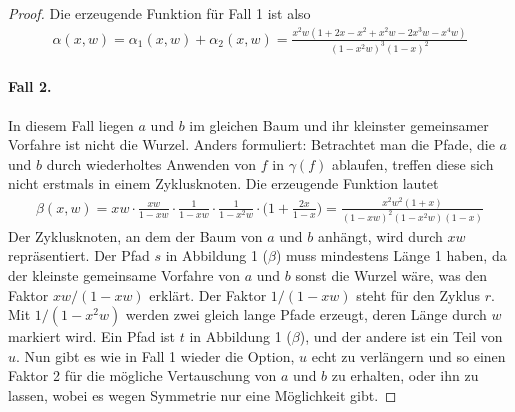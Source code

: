 \documentclass[a4paper, 10pt, ngerman]{article}
\begin{document}
\begin{proof}
    \noindent Die erzeugende Funktion für Fall 1 ist also
    \begin{align*}
        \alpha(x, w)
        = \alpha_1(x, w) + \alpha_2(x, w)
        = \frac {x^2w(1 + 2x - x^2 + x^2w - 2x^3w - x^4w)} {(1 - x^2w)^3(1 - x)^2}
    \end{align*}

    \paragraph{Fall 2.}  In diesem Fall liegen $a$ und $b$ im gleichen Baum und ihr kleinster gemeinsamer Vorfahre ist nicht die Wurzel. Anders formuliert: Betrachtet man die Pfade, die $a$ und $b$ durch wiederholtes Anwenden von $f$ in $\gamma(f)$ ablaufen, treffen diese sich nicht erstmals in einem Zyklusknoten. Die erzeugende Funktion lautet
    \begin{align*}
        \beta(x, w)
        = xw \cdot \frac {xw} {1 - xw} \cdot \frac {1} {1 - xw} \cdot \frac {1} {1 - x^2w} \cdot \Bigg (1 + \frac {2x} {1 - x} \Bigg )
        = \frac {x^2w^2(1 + x)} {(1 - xw)^2(1 - x^2w)(1 - x)}
    \end{align*}
    Der Zyklusknoten, an dem der Baum von $a$ und $b$ anhängt, wird durch $xw$ repräsentiert. Der Pfad $s$ in Abbildung 1 ($\beta$) muss mindestens Länge 1 haben, da der kleinste gemeinsame Vorfahre von $a$ und $b$ sonst die Wurzel wäre, was den Faktor $xw/(1 - xw)$ erklärt. Der Faktor $1/(1 - xw)$ steht für den Zyklus $r$. Mit $1/(1 - x^2w)$ werden zwei gleich lange Pfade erzeugt, deren Länge durch $w$ markiert wird. Ein Pfad ist $t$ in Abbildung 1 ($\beta$), und der andere ist ein Teil von $u$. Nun gibt es wie in Fall 1 wieder die Option, $u$ echt zu verlängern und so einen Faktor 2 für die mögliche Vertauschung von $a$ und $b$ zu erhalten, oder ihn zu lassen, wobei es wegen Symmetrie nur eine Möglichkeit gibt.



\end{proof}
\end{document}
